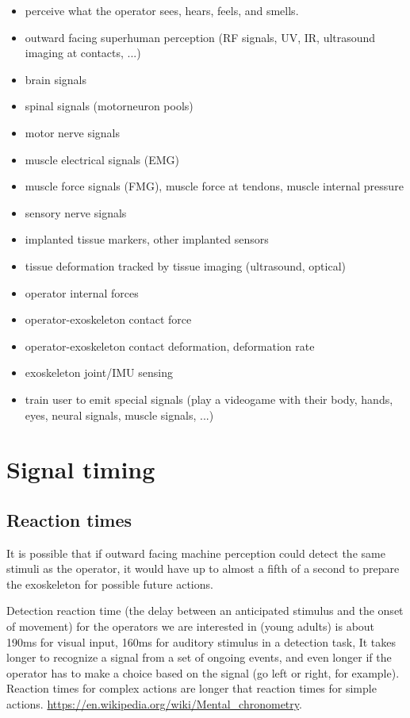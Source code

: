 \documentclass[letterpaper,12pt,fullpage]{article}
\begin{document}
\begin{itemize}
\item
perceive what the operator sees, hears, feels, and smells.
\item
outward facing superhuman perception (RF signals, UV, IR, ultrasound
imaging at contacts, ...)
\item
brain signals
\item
spinal signals (motorneuron pools)
\item
motor nerve signals
\item
muscle electrical signals (EMG)
\item
muscle force signals (FMG), muscle force at tendons, muscle internal pressure
\item
sensory nerve signals
\item
implanted tissue markers, other implanted sensors
\item
tissue deformation tracked by tissue imaging (ultrasound, optical)
\item
operator internal forces
\item
operator-exoskeleton contact force
\item
operator-exoskeleton contact deformation, deformation rate
\item
exoskeleton joint/IMU sensing
\item
train user to emit special signals (play a videogame with their body,
hands, eyes, neural signals, muscle signals, ...)
\end{itemize}

\section{Signal timing}

\subsection{Reaction times}

It is possible that if outward facing machine perception could
detect the same stimuli as the operator,
it would have up to almost a fifth of a second
to prepare the exoskeleton for possible future actions.

Detection reaction time (the delay between an anticipated 
stimulus and the onset of movement) 
for the operators we are interested in (young adults)
is about
190ms for visual input,
160ms for auditory stimulus in a detection task,
It takes longer to recognize a signal from a set of ongoing events,
and even longer if the operator has to make a choice based on the signal
(go left or right, for example).
Reaction times for complex actions are longer that reaction times
for simple actions.
\url{https://en.wikipedia.org/wiki/Mental_chronometry}.
\end{document}
